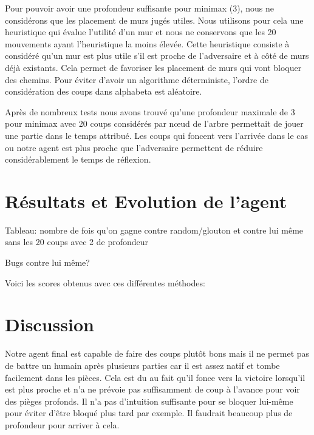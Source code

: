 \documentclass[12pt]{article}
\begin{document}
Pour pouvoir avoir une profondeur suffisante pour minimax (3), nous ne considérons que les placement de murs jugés utiles. Nous utilisons pour cela une heuristique qui évalue l'utilité d'un mur et nous ne conservons que les 20 mouvements ayant l'heuristique la moins élevée. Cette heuristique consiste à considéré qu'un mur est plus utile s'il est proche de l'adversaire et à côté de murs déjà existants. Cela permet de favoriser les placement de murs qui vont bloquer des chemins. Pour éviter d'avoir un algorithme déterministe, l'ordre de considération des coups dans alphabeta est aléatoire. 

Après de nombreux tests nous avons trouvé qu'une profondeur maximale de 3 pour minimax avec 20 coups considérés par nœud de l'arbre permettait de jouer une partie dans le temps attribué. Les coups qui foncent vers l'arrivée dans le cas ou notre agent est plus proche que l'adversaire permettent de réduire considérablement le temps de réflexion. 

\section*{Résultats et Evolution de l'agent}

Tableau: nombre de fois qu'on gagne contre random/glouton et contre lui même sans les 20 coups avec 2 de profondeur

Bugs contre lui même?

Voici les scores obtenus avec ces différentes méthodes:



\section*{Discussion}

Notre agent final est capable de faire des coups plutôt bons mais il ne permet pas de battre un humain après plusieurs parties car il est assez natif et tombe facilement dans les pièces. Cela est du au fait qu'il fonce vers la victoire lorsqu'il est plus proche et n'a ne prévoie pas suffisamment de coup à l'avance pour voir des pièges profonds. Il n'a pas d'intuition suffisante pour se bloquer lui-même pour éviter d'être bloqué plus tard par exemple. Il faudrait beaucoup plus de profondeur pour arriver à cela. 
\end{document}
